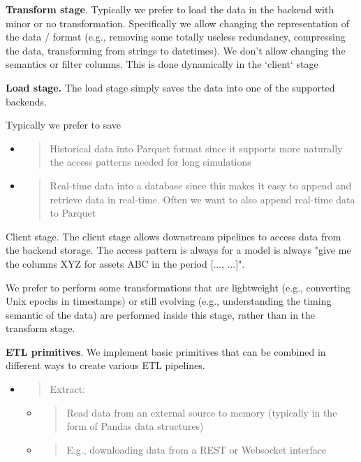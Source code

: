 \documentclass[11pt, reqno]{amsart}
\begin{document}
\textbf{Transform stage}. Typically we prefer to load the data in the
backend with minor or no transformation. Specifically we allow changing
the representation of the data / format (e.g., removing some totally
useless redundancy, compressing the data, transforming from strings to
datetimes). We don't allow changing the semantics or filter columns.
This is done dynamically in the `client` stage

\textbf{Load stage.} The load stage simply saves the data into one of
the supported backends.

Typically we prefer to save

\begin{itemize}
\item
  \begin{quote}
  Historical data into Parquet format since it supports more naturally
  the access patterns needed for long simulations
  \end{quote}
\item
  \begin{quote}
  Real-time data into a database since this makes it easy to append and
  retrieve data in real-time. Often we want to also append real-time
  data to Parquet
  \end{quote}
\end{itemize}

Client stage. The client stage allows downstream pipelines to access
data from the backend storage. The access pattern is always for a model
is always "give me the columns XYZ for assets ABC in the period {[}...,
...{]}".

We prefer to perform some transformations that are lightweight (e.g.,
converting Unix epochs in timestamps) or still evolving (e.g.,
understanding the timing semantic of the data) are performed inside this
stage, rather than in the transform stage.

\textbf{ETL primitives}. We implement basic primitives that can be
combined in different ways to create various ETL pipelines.

\begin{itemize}
\item
  \begin{quote}
  Extract:
  \end{quote}

  \begin{itemize}
  \item
    \begin{quote}
    Read data from an external source to memory (typically in the form
    of Pandas data structures)
    \end{quote}
  \item
    \begin{quote}
    E.g., downloading data from a REST or Websocket interface
    \end{quote}
  \end{itemize}
\end{itemize}
\end{document}
